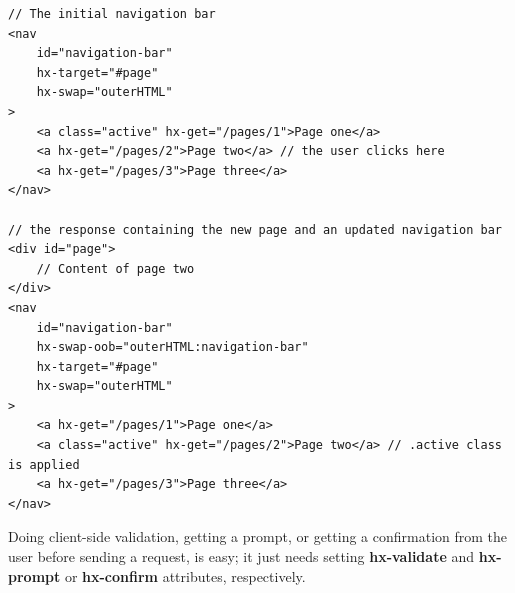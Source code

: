 \begin{lstlisting}[caption=Navigation with HTMX out-of-band request,label=lst:htmx-oob, float]
// The initial navigation bar
<nav
    id="navigation-bar"
    hx-target="#page"
    hx-swap="outerHTML"
>
    <a class="active" hx-get="/pages/1">Page one</a>
    <a hx-get="/pages/2">Page two</a> // the user clicks here
    <a hx-get="/pages/3">Page three</a>
</nav>

// the response containing the new page and an updated navigation bar
<div id="page">
    // Content of page two
</div>
<nav
    id="navigation-bar"
    hx-swap-oob="outerHTML:navigation-bar"
    hx-target="#page"
    hx-swap="outerHTML"
>
    <a hx-get="/pages/1">Page one</a>
    <a class="active" hx-get="/pages/2">Page two</a> // .active class is applied
    <a hx-get="/pages/3">Page three</a>
</nav>

\end{lstlisting}

Doing client-side validation, getting a prompt, or getting a confirmation from the user before sending a request, is easy; it just needs setting \textbf{hx-validate} and \textbf{hx-prompt} or \textbf{hx-confirm} attributes, respectively.